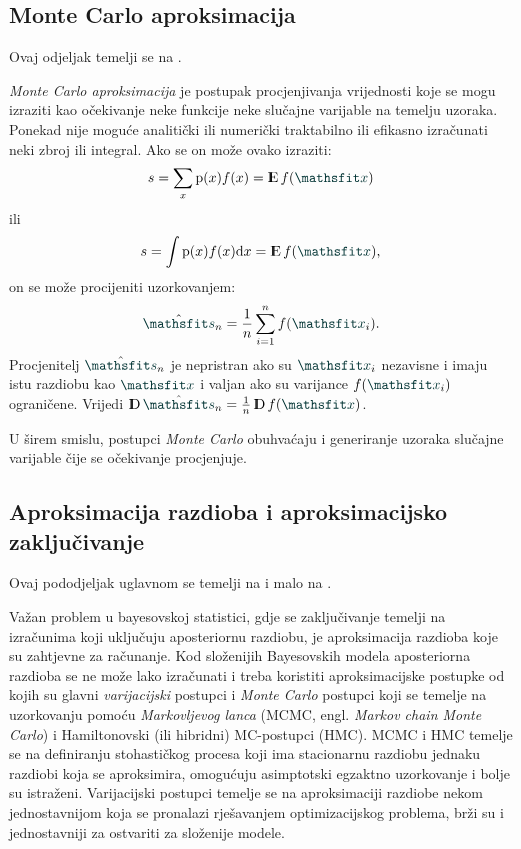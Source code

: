 \documentclass[utf8, diplomski, lmodern]{fer}
\begin{document}
\subsection{Monte Carlo aproksimacija}

Ovaj odjeljak temelji se na \cite{Goodfellow:2016:DL}.

\emph{Monte Carlo aproksimacija} je postupak procjenjivanja vrijednosti koje se mogu izraziti kao očekivanje neke funkcije neke slučajne varijable na temelju uzoraka. Ponekad nije moguće analitički ili numerički traktabilno ili efikasno izračunati neki zbroj ili integral. Ako se on može ovako izraziti:
\begin{align}
s = \sum_x\p(x)f(x) = \E f(\rvar x)
\end{align}
ili
\begin{align}
s = \int\p(x)f(x)\dif x = \E f(\rvar x) \text{,}
\end{align}
on se može procijeniti uzorkovanjem:
\begin{align}
\hat{\rvar s}_n = \frac{1}{n}\sum_{i=1}^n f(\rvar x_i) \text{.}
\end{align}
Procjenitelj $\hat{\rvar s}_n$ je nepristran ako su $\rvar x_i$ nezavisne i imaju istu razdiobu kao $\rvar x$ i valjan ako su varijance $f(\rvar x_i)$ ograničene. Vrijedi $\D\hat{\rvar s}_n = \frac{1}{n} \D f(\rvar x)$.


U širem smislu, postupci \textit{Monte Carlo} obuhvaćaju i generiranje uzoraka slučajne varijable čije se očekivanje procjenjuje.



\subsection{Aproksimacija razdioba i aproksimacijsko zaključivanje}

Ovaj pododjeljak uglavnom se temelji na \citet{Blei:2017:VIRS} i malo na \citet{Yang:2017:UVLB}.

Važan problem u bayesovskoj statistici, gdje se zaključivanje temelji na izračunima koji uključuju aposteriornu razdiobu, je aproksimacija razdioba koje su zahtjevne za računanje. Kod složenijih Bayesovskih modela aposteriorna razdioba se ne može lako izračunati i treba koristiti aproksimacijske postupke od kojih su glavni \emph{varijacijski} postupci \citep{Jordan:1999:IVMGM} i \emph{Monte Carlo} postupci koji se temelje na uzorkovanju pomoću \emph{Markovljevog lanca} (MCMC, engl. \textit{Markov chain Monte Carlo}) i Hamiltonovski (ili hibridni) MC-postupci (HMC). MCMC i HMC temelje se na definiranju stohastičkog procesa koji ima stacionarnu razdiobu jednaku razdiobi koja se aproksimira, omogućuju asimptotski egzaktno uzorkovanje i bolje su istraženi. Varijacijski postupci temelje se na aproksimaciji razdiobe nekom jednostavnijom koja se pronalazi rješavanjem optimizacijskog problema, brži su i jednostavniji za ostvariti za složenije modele.
\end{document}
